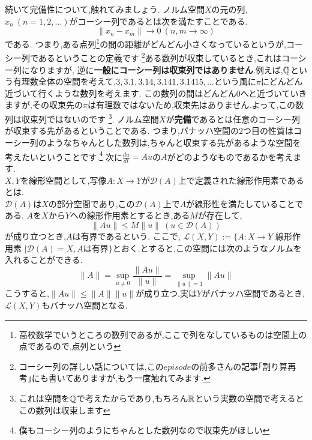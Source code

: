 続いて完備性について,触れてみましょう.
ノルム空間$X$の元の列,$x_n \ (n=1,2,\dotsc)$がコーシー列であるとは次を満たすことである.
\[
\| x_n - x_m \| \to 0 \ (n,m \to \infty)
\]
である.
つまり,ある点列\footnote{高校数学でいうところの数列であるが,ここで列をなしているものは空間上の点であるので,点列という}の間の距離がどんどん小さくなっているというが,コーシー列であるということの定義です.\footnote{コーシー列の詳しい話については,この$episode$の前多さんの記事｢割り算再考｣にも書いてありますが,もう一度触れてみます.}ある数列が収束しているとき,これはコーシー列になりますが,
逆に{\bf 一般にコーシー列は収束列ではありません}.例えば,$\mathbb Q$という有理数全体の空間を考えて,$3,3.1,3.14,3.141,3.1415,\dotsc$という風に$\pi$にどんどん近づいて行くような数列を考えます.
この数列の間はどんどん$0$へと近づいていきますが,その収束先の$\pi$は有理数ではないため,収束先はありません.よって,この数列は収束列ではないのです
\footnote{これは空間を$\mathbb Q$で考えたからであり,もちろん$\mathbb R$という実数の空間で考えるとこの数列は収束します}.
ノルム空間$X$が{\bf 完備}であるとは任意のコーシー列が収束する先があるということである.
つまり,バナッハ空間の$2$つ目の性質はコーシー列のようなちゃんとした数列は,ちゃんと収束する先があるような空間を考えたいということです.\footnote{僕もコーシー列のようにちゃんとした数列なので収束先がほしい}
次に$\frac{du}{dt} = Au$の$A$がどのようなものであるかを考えます.\\
$X,Y$を線形空間として,写像$A:X\to Y$が$\mathcal{D}(A)$上で定義された線形作用素であるとは.\\
$\mathcal{D}(A)$は$X$の部分空間であり,この$\mathcal{D}(A)$上で$A$が線形性を満たしていることである.
{}
$A$を$X$から$Y$への線形作用素とするとき,ある$M$が存在して,
\[
\| Au \| \le M \| u \| \ (u \in \mathcal{D}(A))
\]
が成り立つとき,$A$は有界であるという.
ここで,
$\mathcal{L}(X,Y):= \{ A:X\to Y$ 線形作用素 $| \mathcal{D}(A)= X , A$は有界$ \}$とおく.とすると,この空間には次のようなノルムを入れることができる.
\[\| A \| = \sup_{u\neq 0}\frac{\|Au\|}{\|u\|} = \sup_{\| u \| = 1} \|Au\|\]
こうすると,$\|Au\| \le \|A\|\|u\|$が成り立つ.実は$Y$がバナッハ空間であるとき,$\mathcal{L}(X,Y)$もバナッハ空間となる.

